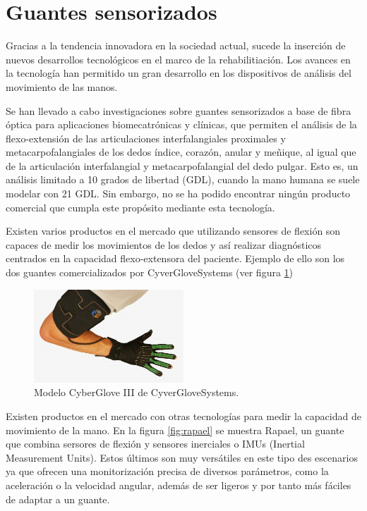 \section{Guantes sensorizados}
\label{sec:captura2}

Gracias a la tendencia innovadora en la sociedad actual, sucede la inserción de nuevos desarrollos tecnológicos en el marco de la rehabilitiación. Los avances en la tecnología han permitido un gran desarrollo en los dispositivos de análisis del movimiento de las manos.

Se han llevado a cabo investigaciones sobre guantes sensorizados a base de fibra óptica para aplicaciones biomecatrónicas y clínicas, que permiten el análisis de la flexo-extensión de las articulaciones interfalangiales proximales y metacarpofalangiales de los dedos índice, corazón, anular y meñique, al igual que de la articulación interfalangial y metacarpofalangial del dedo pulgar. Esto es, un análisis limitado a 10 grados de libertad (GDL), cuando la mano humana se suele modelar con 21 GDL. Sin embargo, no se ha podido encontrar ningún producto comercial que cumpla este propósito mediante esta tecnología.

Existen varios productos en el mercado que utilizando sensores de flexión son capaces de medir los movimientos de los dedos y así realizar diagnósticos centrados en la capacidad flexo-extensora del paciente. Ejemplo de ello son los dos guantes comercializados por CyverGloveSystems (ver figura \ref{fig:CGS}) \cite{CGS}

\begin{figure}[H]
	\centering
	\includegraphics[width=0.5\textwidth]{./img/cgs}
	\caption{Modelo CyberGlove III de CyverGloveSystems. }
	\label{fig:CGS}
\end{figure} 

Existen productos en el mercado con otras tecnologías para medir la capacidad de movimiento de la mano. En la figura \ref{fig:rapael} se muestra Rapael, un guante que combina sersores de flexión y sensores inerciales o IMUs (Inertial Measurement Units). Estos últimos son muy versátiles en este tipo des escenarios ya que ofrecen una monitorización precisa de diversos parámetros, como la aceleración o la velocidad angular, además de ser ligeros y por tanto más fáciles de adaptar a un guante.

